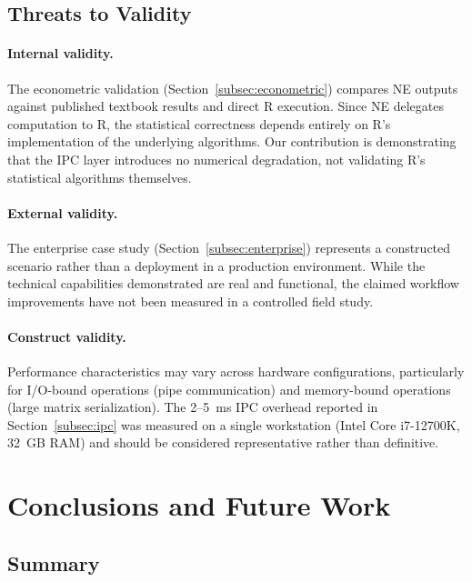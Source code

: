 \documentclass[preprint,12pt,authoryear]{elsarticle}
\newcommand{\neven}{NE\raisebox{0.2ex}{v}\rotatebox[origin=c]{180}{E}\rotatebox[origin=c]{180}{N}}
\begin{document}
\subsection{Threats to Validity}

\paragraph{Internal validity.} The econometric validation (Section~\ref{subsec:econometric}) compares \neven{} outputs against published textbook results and direct R execution. Since \neven{} delegates computation to R, the statistical correctness depends entirely on R's implementation of the underlying algorithms. Our contribution is demonstrating that the IPC layer introduces no numerical degradation, not validating R's statistical algorithms themselves.

\paragraph{External validity.} The enterprise case study (Section~\ref{subsec:enterprise}) represents a constructed scenario rather than a deployment in a production environment. While the technical capabilities demonstrated are real and functional, the claimed workflow improvements have not been measured in a controlled field study.

\paragraph{Construct validity.} Performance characteristics may vary across hardware configurations, particularly for I/O-bound operations (pipe communication) and memory-bound operations (large matrix serialization). The 2--5~ms IPC overhead reported in Section~\ref{subsec:ipc} was measured on a single workstation (Intel Core i7-12700K, 32~GB RAM) and should be considered representative rather than definitive.


\section{Conclusions and Future Work}
\label{sec:conclusion}

\subsection{Summary}
\end{document}
